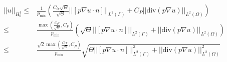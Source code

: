 \documentclass[oneside]{article}
\newtheorem{theorem}{Theorem}[section]
\begin{document}
\begin{equation}
\begin{split}
||u||_{H^1_0}\leq & \frac{1}{p_{\min}}\left(\frac{C_{tr}\sqrt{\Theta}}{\sqrt{\Theta}}||[p\nabla u \cdot n]||_{L^2(\Gamma)}+C_P||\text{div}(p\nabla u)||_{L^2(\Omega)}\right)\\
\leq & \frac{\max\left(\frac{C_tr}{\sqrt{\Theta}},C_P\right)}{p_{\min}}\left(\sqrt{\Theta}||[p\nabla u \cdot n]||_{L^2(\Gamma)}+||\text{div}(p\nabla u)||_{L^2(\Omega)}\right)\\
\leq & \frac{\sqrt{2}\max\left(\frac{C_tr}{\sqrt{\Theta}},C_P\right)}{p_{\min}}\sqrt{\Theta||[p\nabla u \cdot n]||_{L^2(\Gamma)}^2+||\text{div}(p\nabla u)||_{L^2(\Omega)}^2}
\end{split}
\end{equation}





\end{document}
